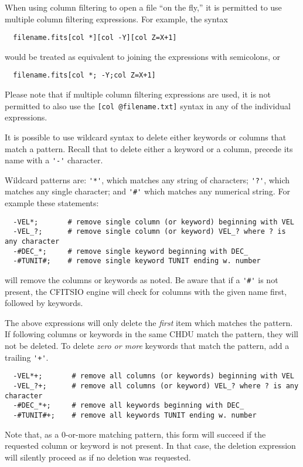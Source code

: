 \documentclass[11pt]{book}
\begin{document}
When using column filtering to open a file ``on the fly,'' it is permitted
to use multiple column filtering expressions.  For example, the
syntax
\begin{verbatim}
  filename.fits[col *][col -Y][col Z=X+1]
\end{verbatim}
would be treated as equivalent to joining the expressions with semicolons, 
or
\begin{verbatim}
  filename.fits[col *; -Y;col Z=X+1]
\end{verbatim}
Please note that if multiple column filtering expressions are used, it is
not permitted to also use the \verb+[col @filename.txt]+ syntax in any
of the individual expressions.

It is possible to use wildcard syntax to delete either keywords or
columns that match a pattern.  Recall that to delete either a keyword
or a column, precede its name with a \verb+'-'+ character.

Wildcard patterns are: \verb+'*'+, which matches any
string of characters; \verb+'?'+, which matches any single character; and \verb+'#'+
which matches any numerical string.  For example these
statements:
\begin{verbatim}
  -VEL*;       # remove single column (or keyword) beginning with VEL
  -VEL_?;      # remove single column (or keyword) VEL_? where ? is any character
  -#DEC_*;     # remove single keyword beginning with DEC_
  -#TUNIT#;    # remove single keyword TUNIT ending w. number
\end{verbatim}
will remove the columns or keywords as noted.  Be aware that if a
\verb+'#'+ is not present, the CFITSIO engine will check for columns
with the given name first, followed by keywords.

The above expressions will only delete the {\it first}
item which matches the pattern.  If following columns or keywords
in the same CHDU match the pattern, they will not be deleted.
To delete {\it zero or more} keywords that match the pattern, add a
trailing \verb|'+'|.
\begin{verbatim}
  -VEL*+;       # remove all columns (or keywords) beginning with VEL
  -VEL_?+;      # remove all columns (or keyword) VEL_? where ? is any character
  -#DEC_*+;     # remove all keywords beginning with DEC_
  -#TUNIT#+;    # remove all keywords TUNIT ending w. number
\end{verbatim}
Note that, as a 0-or-more matching pattern, this form will succeed if
the requested column or keyword is not present.  In that case, the
deletion expression will silently proceed as if no deletion was requested.
\end{document}
